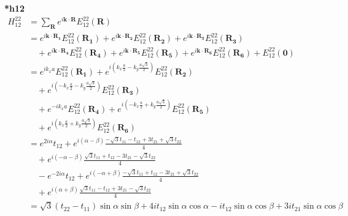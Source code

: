 \documentclass{report}
\begin{document}
\noindent\textbf{*h12}
\begin{align*}
	H^{22}_{12} & = \sum_{\mathbf{R}} e^{i \mathbf{k} \cdot \mathbf{R}} E^{22}_{12}(\mathbf{R})                             \\
	            & = e^{i \mathbf{k} \cdot \mathbf{R_1}} E^{22}_{12}(\mathbf{R_1})
	+ e^{i \mathbf{k} \cdot \mathbf{R_2}} E^{22}_{12}(\mathbf{R_2})
	+ e^{i \mathbf{k} \cdot \mathbf{R_3}} E^{22}_{12}(\mathbf{R_3})                                                         \\
	            & \quad + e^{i \mathbf{k} \cdot \mathbf{R_4}} E^{22}_{12}(\mathbf{R_4})
	+ e^{i \mathbf{k} \cdot \mathbf{R_5}} E^{22}_{12}(\mathbf{R_5})
	+ e^{i \mathbf{k} \cdot \mathbf{R_6}} E^{22}_{12}(\mathbf{R_6})
	+ E^{22}_{12}(\mathbf{0})                                                                                               \\
	            & = e^{i k_x a} E^{22}_{12}(\mathbf{R_1})
	+ e^{i \left( k_x \frac{a}{2} - k_y \frac{a\sqrt{3}}{2} \right)} E^{22}_{12}(\mathbf{R_2})                              \\
	            & \quad + e^{i \left( -k_x \frac{a}{2} - k_y \frac{a\sqrt{3}}{2} \right)} E^{22}_{12}(\mathbf{R_3})         \\
	            & \quad + e^{-i k_x a } E^{22}_{12}(\mathbf{R_4})
	+ e^{i \left( -k_x \frac{a}{2} + k_y \frac{a\sqrt{3}}{2} \right)} E^{22}_{12}(\mathbf{R_5})                             \\
	            & \quad + e^{i \left( k_x \frac{a}{2} + k_y \frac{a\sqrt{3}}{2} \right)} E^{22}_{12}(\mathbf{R_6})          \\
	            & = e^{2i\alpha} t_{12}
	+ e^{i \left( \alpha - \beta \right)} \frac{-\sqrt{3}t_{11} - t_{12} + 3t_{21} + \sqrt{3}t_{22}}{4}                     \\
	            & \quad + e^{i \left( -\alpha - \beta \right)} \frac{\sqrt{3}t_{11} + t_{12} - 3t_{21} - \sqrt{3}t_{22}}{4} \\
	            & \quad - e^{-2i\alpha} t_{12}
	+ e^{i \left( -\alpha + \beta \right)} \frac{-\sqrt{3}t_{11} + t_{12} - 3t_{21} + \sqrt{3}t_{22}}{4}                    \\
	            & \quad + e^{i \left( \alpha + \beta \right)} \frac{\sqrt{3}t_{11} - t_{12} + 3t_{21} - \sqrt{3}t_{22}}{4}  \\
	            & = \sqrt{3}(t_{22} - t_{11}) \sin\alpha \sin\beta
	+ 4i t_{12} \sin\alpha \cos \alpha - i t_{12} \sin\alpha \cos\beta  + 3i t_{21} \sin\alpha \cos\beta
\end{align*}
\end{document}
